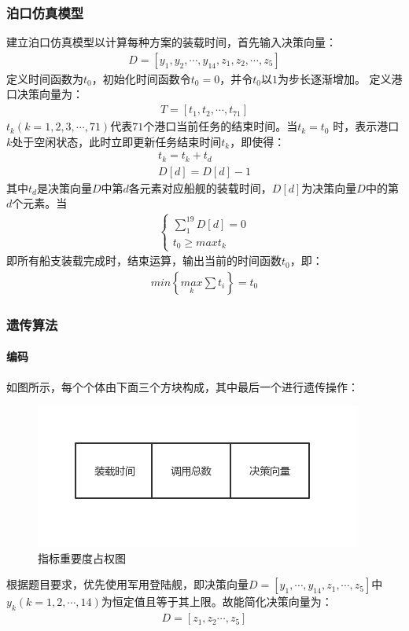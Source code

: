 \documentclass{whutmod}
\begin{document}
	\subsubsection{泊口仿真模型}
	建立泊口仿真模型以计算每种方案的装载时间，首先输入决策向量：
		\begin{gather*}
	 D=[y_{1},y_{2},\cdots,y_{14},z_{1},z_{2},\cdots,z_{5}]
		\end{gather*}
	定义时间函数为$t_{0}$，初始化时间函数令$t_{0}=0$，并令$t_{0}$以$1$为步长逐渐增加。
	定义港口决策向量为：
		\begin{gather*}
		T=[t_{1},t_{2},\cdots,t_{71}]
		\end{gather*}
	$t_{k}(k=1,2,3,\cdots,71)$代表$71$个港口当前任务的结束时间。当$t_{k}=t_{0}$ 时，表示港口$k$处于空闲状态，此时立即更新任务结束时间$t_{k}$，即使得：
		\begin{gather*}
		t_{k}=t_{k}+t_{d}\\
		D[d]=D[d]-1
		\end{gather*}
	其中$t_{d}$是决策向量$D$中第$d$各元素对应船舰的装载时间，$D[d]$为决策向量$D$中的第$d$个元素。当
		\begin{gather*}
	\left\{\begin{matrix} \sum_{1}^{19}D[d]=0
	\\t_{0}\geqslant max t_{k} 	
	\end{matrix}\right.
		\end{gather*}
		即所有船支装载完成时，结束运算，输出当前的时间函数$t_{0}$，即：
			\begin{gather*}
		min \left \{ \underset{k}{max}\sum t_{i} \right \}=t_{0}
			\end{gather*}
	\subsubsection{遗传算法}
	 \paragraph{编码}
	 如图所示，每个个体由下面三个方块构成，其中最后一个进行遗传操作：
	 	\begin{figure}[H]
	 	\centering
	 	\includegraphics[width=.7\textwidth]{figures/yichuan.png}
	 	\caption{指标重要度占权图}\label{yichuan}
	 	 \end{figure}
	 根据题目要求，优先使用军用登陆舰，即决策向量$D=[y_{1},\cdots,y_{14},z_{1},\cdots,z_{5}]$中$y_{k}(k=1,2,\cdots,14)$为恒定值且等于其上限。故能简化决策向量为：
	\begin{gather*}
	D=[z_{1},z_{2}\cdots,z_{5}]
	\end{gather*}
\end{document}
